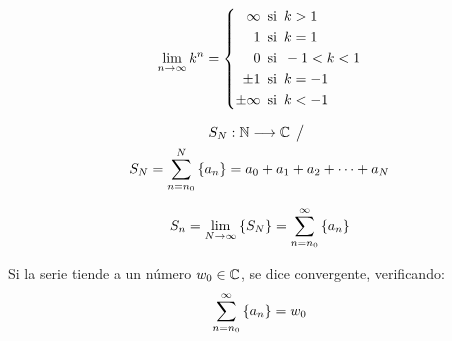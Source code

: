 \begin{mdframed}[style=PropertyFrame]
    \begin{prop}
    \end{prop}
    \begin{equation*}
        \lim_{n\to\infty} k^n =
        \left\{
        \begin{aligned}
            \infty \enspace & \textrm{si} \enspace k>1
            \\
            1 \enspace & \textrm{si} \enspace k=1
            \\
            0 \enspace & \textrm{si} \enspace -1<k<1
            \\
            \pm 1 \enspace & \textrm{si} \enspace k = -1
            \\
            \pm \infty \enspace & \textrm{si} \enspace k<-1
        \end{aligned}
        \right.
    \end{equation*}
\end{mdframed}

\begin{mdframed}[style=DefinitionFrame]
    \begin{defn}
    \end{defn}
    \begin{gather*}
        S_N: \mathbb{N} \longrightarrow \mathbb{C} \hspace{1ex} \big/ \hspace{1ex}
        \\
        S_N = \sum_{n=n_0}^N { \left\{ {a_n} \right\} } = a_0 + a_1 + a_2 + \dots + a_N
    \end{gather*}
\end{mdframed}

\begin{mdframed}[style=DefinitionFrame]
    \begin{defn}
    \end{defn}
    \begin{equation*}
        S_n = \lim_{N \to \infty} { \left\{ {S_N} \right\} } = \sum_{n=n_0}^ \infty { \left\{ {a_n} \right\} }
    \end{equation*}
\end{mdframed}

Si la serie tiende a un número $w_0 \in \mathbb{C}$, se dice convergente, verificando:
\begin{equation*}
    \sum_{n=n_0}^ \infty { \left\{ {a_n} \right\} } = w_0
\end{equation*}


